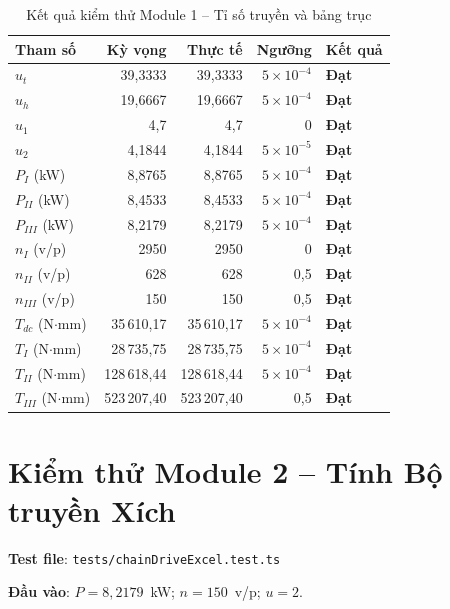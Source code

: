 \begin{table}[H]
  \centering
  \caption{Kết quả kiểm thử Module 1 -- Tỉ số truyền và bảng trục}
  \label{tab:test-m1-ratio}
  \begin{tabular}{lrrrl}
    \toprule
    \textbf{Tham số} & \textbf{Kỳ vọng} & \textbf{Thực tế} & \textbf{Ngưỡng} & \textbf{Kết quả} \\
    \midrule
    $u_t$ & 39,3333 & 39,3333 & $5\times10^{-4}$ & \textbf{Đạt} \\
    $u_h$ & 19,6667 & 19,6667 & $5\times10^{-4}$ & \textbf{Đạt} \\
    $u_1$ & 4,7     & 4,7     & 0 & \textbf{Đạt} \\
    $u_2$ & 4,1844  & 4,1844  & $5\times10^{-5}$ & \textbf{Đạt} \\
    $P_I$ (kW) & 8,8765 & 8,8765 & $5\times10^{-4}$ & \textbf{Đạt} \\
    $P_{II}$ (kW) & 8,4533 & 8,4533 & $5\times10^{-4}$ & \textbf{Đạt} \\
    $P_{III}$ (kW) & 8,2179 & 8,2179 & $5\times10^{-4}$ & \textbf{Đạt} \\
    $n_I$ (v/p) & 2950 & 2950 & 0 & \textbf{Đạt} \\
    $n_{II}$ (v/p) & 628 & 628 & 0,5 & \textbf{Đạt} \\
    $n_{III}$ (v/p) & 150 & 150 & 0,5 & \textbf{Đạt} \\
    $T_{dc}$ (N$\cdot$mm) & 35\,610,17 & 35\,610,17 & $5\times10^{-4}$ & \textbf{Đạt} \\
    $T_I$ (N$\cdot$mm) & 28\,735,75 & 28\,735,75 & $5\times10^{-4}$ & \textbf{Đạt} \\
    $T_{II}$ (N$\cdot$mm) & 128\,618,44 & 128\,618,44 & $5\times10^{-4}$ & \textbf{Đạt} \\
    $T_{III}$ (N$\cdot$mm) & 523\,207,40 & 523\,207,40 & 0,5 & \textbf{Đạt} \\
    \bottomrule
  \end{tabular}
\end{table}

\section{Kiểm thử Module 2 -- Tính Bộ truyền Xích}
\label{sec:test-m2}

\textbf{Test file}: \texttt{tests/chainDriveExcel.test.ts}

\textbf{Đầu vào}: $P = 8{,}2179$~kW; $n = 150$~v/p; $u = 2$.

